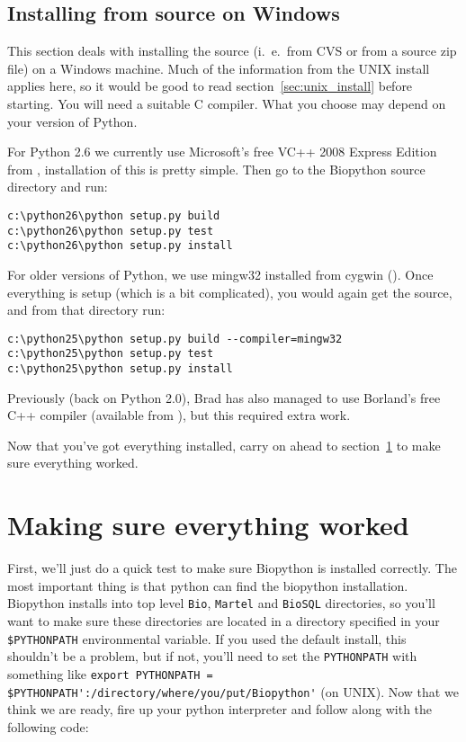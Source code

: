 \documentclass{article}
\begin{document}
\subsection{Installing from source on Windows}
\label{sec:windows_install}

This section deals with installing the source (i.~e.~from CVS or from a source zip file) on a Windows machine. Much of the information from the UNIX install applies here, so it would be good to read section~\ref{sec:unix_install} before starting.  You will need a suitable C compiler.
What you choose may depend on your version of Python.

For Python 2.6 we currently use Microsoft's free VC++ 2008 Express Edition from , installation of this is pretty simple.  Then go to the Biopython source directory and run:

\begin{verbatim}
c:\python26\python setup.py build
c:\python26\python setup.py test
c:\python26\python setup.py install
\end{verbatim}

For older versions of Python, we use mingw32 installed from cygwin ().  Once everything is setup (which is a bit complicated), you would again get the source, and from that directory run:

\begin{verbatim}
c:\python25\python setup.py build --compiler=mingw32
c:\python25\python setup.py test
c:\python25\python setup.py install
\end{verbatim}

Previously (back on Python 2.0), Brad has also managed to use Borland's free C++ compiler (available from ), but this required extra work.

Now that you've got everything installed, carry on ahead to section~\ref{sec:is_working} to make sure everything worked.

\section{Making sure everything worked}
\label{sec:is_working}

First, we'll just do a quick test to make sure Biopython is installed correctly. The most important thing is that python can find the biopython installation. Biopython installs into top level \verb|Bio|, \verb|Martel| and \verb|BioSQL| directories, so you'll want to make sure these directories are located in a directory specified 
in your\verb| $PYTHONPATH| environmental variable. If you used the default install, this shouldn't be a problem, but if not, you'll need to set the \verb|PYTHONPATH| with something like \verb|export PYTHONPATH = $PYTHONPATH':/directory/where/you/put/Biopython'| (on UNIX). Now that we think we are ready, fire up your python interpreter and follow along with the following code:
\end{document}
